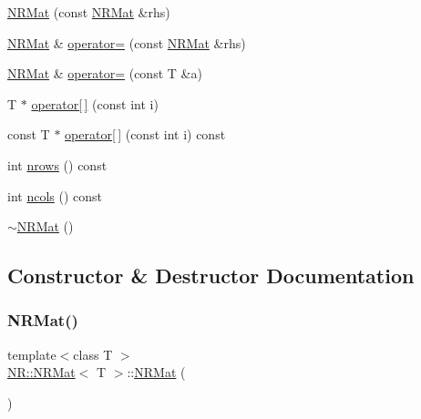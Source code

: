 \begin{DoxyCompactItemize}
\item 
\mbox{\hyperlink{classNR_1_1NRMat_a7ad1dc6f56c44d5d0a7b595d48206cfa}{N\+R\+Mat}} (const \mbox{\hyperlink{classNR_1_1NRMat}{N\+R\+Mat}} \&rhs)
\item 
\mbox{\hyperlink{classNR_1_1NRMat}{N\+R\+Mat}} \& \mbox{\hyperlink{classNR_1_1NRMat_aba1c1ba10bf1b6ae9c2b78273e575dc4}{operator=}} (const \mbox{\hyperlink{classNR_1_1NRMat}{N\+R\+Mat}} \&rhs)
\item 
\mbox{\hyperlink{classNR_1_1NRMat}{N\+R\+Mat}} \& \mbox{\hyperlink{classNR_1_1NRMat_a6a8155b47cfdfb634440ad6600120087}{operator=}} (const T \&a)
\item 
T $\ast$ \mbox{\hyperlink{classNR_1_1NRMat_a387bf9be7d9606ea60e697c31c73df53}{operator\mbox{[}$\,$\mbox{]}}} (const int i)
\item 
const T $\ast$ \mbox{\hyperlink{classNR_1_1NRMat_a260aec593a5ef0c2166f6f4816ddfd2c}{operator\mbox{[}$\,$\mbox{]}}} (const int i) const
\item 
int \mbox{\hyperlink{classNR_1_1NRMat_aacebd802ca3dea0e0079a8dd27f7102c}{nrows}} () const
\item 
int \mbox{\hyperlink{classNR_1_1NRMat_ad6c5ecfb47d80c934bedeb7ea395fd84}{ncols}} () const
\item 
\mbox{\hyperlink{classNR_1_1NRMat_a8b6826b7a7556a397ee7d7ad382e5dae}{$\sim$\+N\+R\+Mat}} ()
\end{DoxyCompactItemize}


\subsection{Constructor \& Destructor Documentation}
\mbox{\label{classNR_1_1NRMat_abcaca2687429fc0f26cde34647f7c981}} 
\subsubsection{\texorpdfstring{NRMat()}{NRMat()}\hspace{0.1cm}{\footnotesize\ttfamily [1/15]}}
{\footnotesize\ttfamily template$<$class T $>$ \\
\mbox{\hyperlink{classNR_1_1NRMat}{N\+R\+::\+N\+R\+Mat}}$<$ T $>$\+::\mbox{\hyperlink{classNR_1_1NRMat}{N\+R\+Mat}} (\begin{DoxyParamCaption}{ }\end{DoxyParamCaption})}

